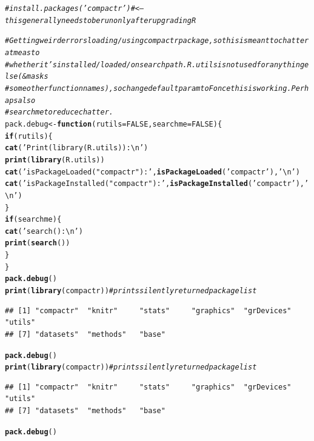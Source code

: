 \documentclass{article}\usepackage[]{graphicx}\usepackage[]{color}
\makeatletter
\newcommand{\hlnum}[1]{\textcolor[rgb]{0.686,0.059,0.569}{#1}}%
\newcommand{\hlstr}[1]{\textcolor[rgb]{0.192,0.494,0.8}{#1}}%
\newcommand{\hlcom}[1]{\textcolor[rgb]{0.678,0.584,0.686}{\textit{#1}}}%
\newcommand{\hlstd}[1]{\textcolor[rgb]{0.345,0.345,0.345}{#1}}%
\newcommand{\hlkwa}[1]{\textcolor[rgb]{0.161,0.373,0.58}{\textbf{#1}}}%
\newcommand{\hlkwb}[1]{\textcolor[rgb]{0.69,0.353,0.396}{#1}}%
\newcommand{\hlkwc}[1]{\textcolor[rgb]{0.333,0.667,0.333}{#1}}%
\newcommand{\hlkwd}[1]{\textcolor[rgb]{0.737,0.353,0.396}{\textbf{#1}}}%
\newenvironment{kframe}{%
 \def\at@end@of@kframe{}%
 \ifinner\ifhmode%
  \def\at@end@of@kframe{\end{minipage}}%
  \begin{minipage}{\columnwidth}%
 \fi\fi%
 \def\FrameCommand##1{\hskip\@totalleftmargin \hskip-\fboxsep
 \colorbox{shadecolor}{##1}\hskip-\fboxsep
     \hskip-\linewidth \hskip-\@totalleftmargin \hskip\columnwidth}%
 \MakeFramed {\advance\hsize-\width
   \@totalleftmargin\z@ \linewidth\hsize
   \@setminipage}}%
 {\par\unskip\endMakeFramed%
 \at@end@of@kframe}
\newenvironment{knitrout}{}{} %
\makeatother
\begin{document}
\begin{knitrout}\footnotesize
{}\color{fgcolor}\begin{kframe}
\begin{alltt}
\hlcom{# install.packages('compactr') # <-- this generally needs to be run only after upgrading R}

\hlcom{# Getting weird errors loading/using compactr package, so this is meant to chatter at me as to}
\hlcom{# whether it's installed/loaded/on search path.  R.utils is not used for anything else (& masks}
\hlcom{# some other function names), so change default param to F once this is working. Perhaps also}
\hlcom{# searchme to reduce chatter.  }
\hlstd{pack.debug} \hlkwb{<-}\hlkwa{function}\hlstd{(}\hlkwc{rutils}\hlstd{=}\hlnum{FALSE}\hlstd{,}\hlkwc{searchme}\hlstd{=}\hlnum{FALSE}\hlstd{)\{}
  \hlkwa{if}\hlstd{(rutils)\{}
    \hlkwd{cat}\hlstd{(}\hlstr{'Print(library(R.utils)):\textbackslash{}n'}\hlstd{)}
    \hlkwd{print}\hlstd{(}\hlkwd{library}\hlstd{(R.utils))}
    \hlkwd{cat}\hlstd{(}\hlstr{'isPackageLoaded("compactr"):'}\hlstd{,}\hlkwd{isPackageLoaded}\hlstd{(}\hlstr{'compactr'}\hlstd{),}\hlstr{'\textbackslash{}n'}\hlstd{)}
    \hlkwd{cat}\hlstd{(}\hlstr{'isPackageInstalled("compactr"):'}\hlstd{,} \hlkwd{isPackageInstalled}\hlstd{(}\hlstr{'compactr'}\hlstd{),} \hlstr{'\textbackslash{}n'}\hlstd{)}
  \hlstd{\}}
  \hlkwa{if}\hlstd{(searchme)\{}
    \hlkwd{cat}\hlstd{(}\hlstr{'search():\textbackslash{}n'}\hlstd{)}
    \hlkwd{print}\hlstd{(}\hlkwd{search}\hlstd{())}
  \hlstd{\}}
\hlstd{\}}
\hlkwd{pack.debug}\hlstd{()}
\hlkwd{print}\hlstd{(}\hlkwd{library}\hlstd{(compactr))} \hlcom{# prints silently returned package list}
\end{alltt}
\begin{verbatim}
## [1] "compactr"  "knitr"     "stats"     "graphics"  "grDevices" "utils"    
## [7] "datasets"  "methods"   "base"
\end{verbatim}
\begin{alltt}
\hlkwd{pack.debug}\hlstd{()}
\hlkwd{print}\hlstd{(}\hlkwd{library}\hlstd{(compactr))} \hlcom{# prints silently returned package list}
\end{alltt}
\begin{verbatim}
## [1] "compactr"  "knitr"     "stats"     "graphics"  "grDevices" "utils"    
## [7] "datasets"  "methods"   "base"
\end{verbatim}
\begin{alltt}
\hlkwd{pack.debug}\hlstd{()}
\end{alltt}
\end{kframe}
\end{knitrout}
\end{document}
